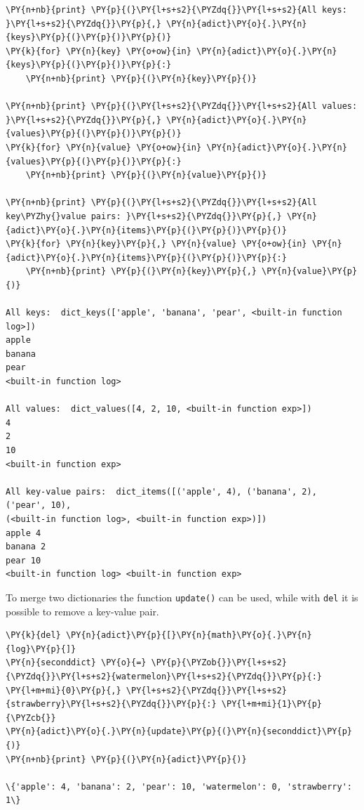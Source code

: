 \begin{codebox}[breakable, size=fbox, boxrule=1pt, pad at break*=1mm, colback=cellbackground, colframe=cellborder]
\begin{Verbatim}[commandchars=\\\{\}]
\PY{n+nb}{print} \PY{p}{(}\PY{l+s+s2}{\PYZdq{}}\PY{l+s+s2}{All keys: }\PY{l+s+s2}{\PYZdq{}}\PY{p}{,} \PY{n}{adict}\PY{o}{.}\PY{n}{keys}\PY{p}{(}\PY{p}{)}\PY{p}{)}
\PY{k}{for} \PY{n}{key} \PY{o+ow}{in} \PY{n}{adict}\PY{o}{.}\PY{n}{keys}\PY{p}{(}\PY{p}{)}\PY{p}{:}
    \PY{n+nb}{print} \PY{p}{(}\PY{n}{key}\PY{p}{)}

\PY{n+nb}{print} \PY{p}{(}\PY{l+s+s2}{\PYZdq{}}\PY{l+s+s2}{All values: }\PY{l+s+s2}{\PYZdq{}}\PY{p}{,} \PY{n}{adict}\PY{o}{.}\PY{n}{values}\PY{p}{(}\PY{p}{)}\PY{p}{)}
\PY{k}{for} \PY{n}{value} \PY{o+ow}{in} \PY{n}{adict}\PY{o}{.}\PY{n}{values}\PY{p}{(}\PY{p}{)}\PY{p}{:}
    \PY{n+nb}{print} \PY{p}{(}\PY{n}{value}\PY{p}{)}

\PY{n+nb}{print} \PY{p}{(}\PY{l+s+s2}{\PYZdq{}}\PY{l+s+s2}{All key\PYZhy{}value pairs: }\PY{l+s+s2}{\PYZdq{}}\PY{p}{,} \PY{n}{adict}\PY{o}{.}\PY{n}{items}\PY{p}{(}\PY{p}{)}\PY{p}{)}
\PY{k}{for} \PY{n}{key}\PY{p}{,} \PY{n}{value} \PY{o+ow}{in} \PY{n}{adict}\PY{o}{.}\PY{n}{items}\PY{p}{(}\PY{p}{)}\PY{p}{:}
    \PY{n+nb}{print} \PY{p}{(}\PY{n}{key}\PY{p}{,} \PY{n}{value}\PY{p}{)}

All keys:  dict_keys(['apple', 'banana', 'pear', <built-in function log>])
apple
banana
pear
<built-in function log>

All values:  dict_values([4, 2, 10, <built-in function exp>])
4
2
10
<built-in function exp>

All key-value pairs:  dict_items([('apple', 4), ('banana', 2), ('pear', 10),
(<built-in function log>, <built-in function exp>)])
apple 4
banana 2
pear 10
<built-in function log> <built-in function exp>
\end{Verbatim}
\end{codebox}

To merge two dictionaries the function \texttt{update()} can be used, while with 
\texttt{del} it is possible to remove a key-value pair.

\begin{codebox}[breakable, size=fbox, boxrule=1pt, pad at break*=1mm, colback=cellbackground, colframe=cellborder]
\begin{Verbatim}[commandchars=\\\{\}]
\PY{k}{del} \PY{n}{adict}\PY{p}{[}\PY{n}{math}\PY{o}{.}\PY{n}{log}\PY{p}{]}
\PY{n}{seconddict} \PY{o}{=} \PY{p}{\PYZob{}}\PY{l+s+s2}{\PYZdq{}}\PY{l+s+s2}{watermelon}\PY{l+s+s2}{\PYZdq{}}\PY{p}{:} \PY{l+m+mi}{0}\PY{p}{,} \PY{l+s+s2}{\PYZdq{}}\PY{l+s+s2}{strawberry}\PY{l+s+s2}{\PYZdq{}}\PY{p}{:} \PY{l+m+mi}{1}\PY{p}{\PYZcb{}}
\PY{n}{adict}\PY{o}{.}\PY{n}{update}\PY{p}{(}\PY{n}{seconddict}\PY{p}{)}
\PY{n+nb}{print} \PY{p}{(}\PY{n}{adict}\PY{p}{)}

\{'apple': 4, 'banana': 2, 'pear': 10, 'watermelon': 0, 'strawberry': 1\}
\end{Verbatim}
\end{codebox}

